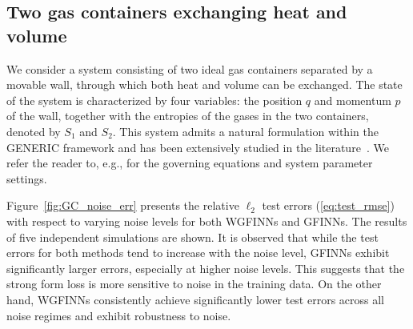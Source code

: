 \documentclass[final]{siamltex}
\begin{document}
\subsection{Two gas containers exchanging heat and volume}
\label{sec:gas_containers}
We consider a system consisting of two ideal gas containers separated by a movable wall,
through which both heat and volume can be exchanged. 
The state of the system is characterized by four variables:
the position \(q\) and momentum \(p\) of the wall,
together with the entropies of the gases in the two containers,
denoted by \(S_1\) and \(S_2\). 
This system admits a natural formulation within the GENERIC framework and has been extensively studied in the literature~\cite{ottinger2005beyond, shang2020structure, zhang2022gfinns, park2024tlasdi}. We refer the reader to, e.g., \cite{zhang2022gfinns} for the governing equations and system parameter settings.


Figure~\ref{fig:GC_noise_err} presents the relative $\ell_2$ test errors (\ref{eq:test_rmse}) with respect to varying noise levels for both WGFINNs and GFINNs. The results of five independent simulations are shown.
It is observed that while the test errors for both methods tend to increase with the noise level, GFINNs exhibit significantly larger errors, especially at higher noise levels. This suggests that the strong form loss is more sensitive to noise in the training data. 
On the other hand, WGFINNs consistently achieve significantly lower test errors across all noise regimes and exhibit robustness to noise.
\end{document}
